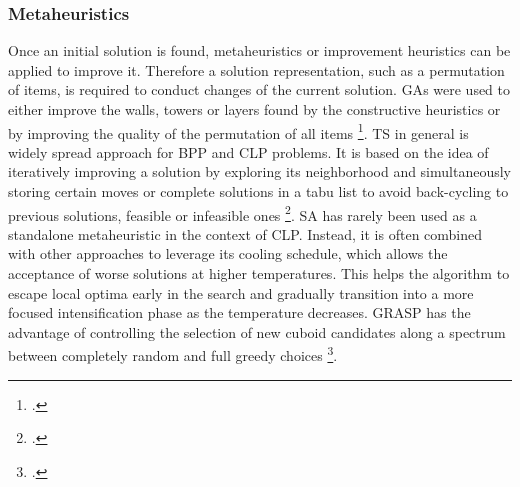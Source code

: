 \subsubsection{Metaheuristics}
Once an initial solution is found, metaheuristics or improvement heuristics can be applied
to improve it. Therefore a solution representation, such as a permutation of items, is required
to conduct changes of the current solution. \gls{GA}s were
used to either improve the walls, towers or layers found by the constructive heuristics
or by improving the quality of the permutation of all items \footcite[cf.][]{gehring_genetic_1997,bortfeldt_hybrid_2001}.
\gls{TS} in general is widely spread approach for \gls{BPP} and \gls{CLP} problems. It is based on
the idea of iteratively improving a solution by exploring its neighborhood and simultaneously
storing certain moves or complete solutions in a tabu list to avoid back-cycling to
previous solutions, feasible or infeasible ones \footcite[cf.][pp. 344--345]{gendreau_tabu_2006}. \gls{SA} has rarely been used as a
standalone metaheuristic in the context of \gls{CLP}. Instead, it is often combined
with other approaches to leverage its cooling schedule, which allows the acceptance of
worse solutions at higher temperatures. This helps the algorithm to escape local optima
early in the search and gradually transition into a more focused intensification phase as
the temperature decreases. \gls{GRASP} has the advantage of controlling the selection of new
cuboid candidates along a spectrum between completely random and full greedy choices \footcite[cf.][]{moura_grasp_2005}.

